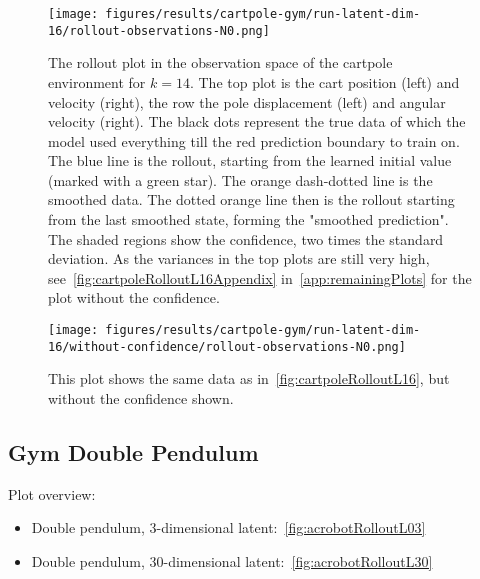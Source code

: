 		\begin{figure}
			\centering
			\texttt{[image: figures/results/cartpole-gym/run-latent-dim-16/rollout-observations-N0.png]}
			\caption[Rollout of the cartpole experiment for 14 latent dimensions with confidence]{The rollout plot in the observation space of the cartpole environment for \(k = 14\). The top plot is the cart position (left) and velocity (right), the row the pole displacement (left) and angular velocity (right). The black dots represent the true data of which the model used everything till the red prediction boundary to train on. The blue line is the rollout, starting from the learned initial value (marked with a green star). The orange dash-dotted line is the smoothed data. The dotted orange line then is the rollout starting from the last smoothed state, forming the "smoothed prediction". The shaded regions show the confidence, \ie two times the standard deviation. As the variances in the top plots are still very high, see~\autoref{fig:cartpoleRolloutL16Appendix} in~\autoref{app:remainingPlots} for the plot without the confidence.}
			\label{fig:cartpoleRolloutL16}
		\end{figure}
		\begin{figure}
			\centering
			\texttt{[image: figures/results/cartpole-gym/run-latent-dim-16/without-confidence/rollout-observations-N0.png]}
			\caption[Rollout of the cartpole experiment for 14 latent dimensions without confidence]{This plot shows the same data as in~\autoref{fig:cartpoleRolloutL16}, but without the confidence shown.}
			\label{fig:cartpoleRolloutL16Appendix}
		\end{figure}

	\subsection{Gym Double Pendulum}
		Plot overview:
		\begin{itemize}
			\item Double pendulum, 3-dimensional latent:~\autoref{fig:acrobotRolloutL03}
			\item Double pendulum, 30-dimensional latent:~\autoref{fig:acrobotRolloutL30}
		\end{itemize}

